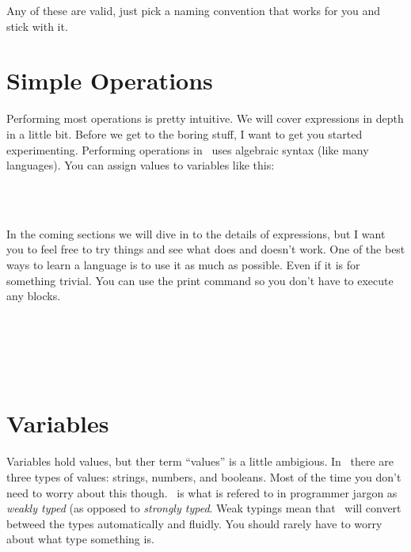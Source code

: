 \documentclass{book}
\begin{document}
Any of these are valid, just pick a naming convention that works for you and stick with it.  

\section{Simple Operations}

Performing most operations is pretty intuitive.  We will cover expressions in depth in a little bit.  Before we get to the boring stuff, I want to get you started experimenting.  Performing operations in \SSquared\ uses algebraic syntax (like many languages).  You can assign values to variables like this:

\begin{SSCodeBox}
\scitea{;} \\
\scitea{;} \\
\scitea{;}
\end{SSCodeBox}

In the coming sections we will dive in to the details of expressions, but I want you to feel free to try things and see what does and doesn't work.  One of the best ways to learn a language is to use it as much as possible.  Even if it is for something trivial.  You can use the print command so you don't have to execute any blocks.

\begin{SSCodeBox}
\scitea{} \\
\scitea{;} \\
\scitea{;} \\
\scitea{;} \\
\scitea{(}
\end{SSCodeBox}

\section{Variables}

Variables hold values, but ther term ``values'' is a little ambigious.  In \SSquared\ there are three types of values: strings, numbers, and booleans.  Most of the time you don't need to worry about this though.  \SSquared\ is what is refered to in programmer jargon as \emph{weakly typed} (as opposed to \emph{strongly typed}.  Weak typings mean that \SSquared\ will convert betweed the types automatically and fluidly.  You should rarely have to worry about what type something is.
\end{document}

